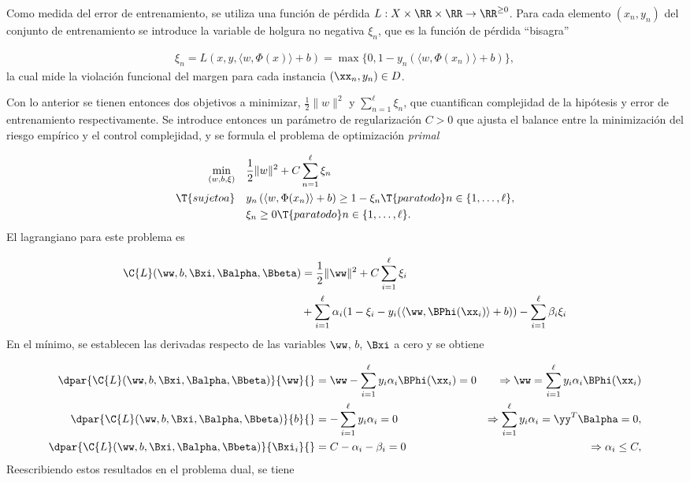 Como medida del error de entrenamiento, se utiliza una función de
pérdida $L:X\times\RR\times\RR\rightarrow\RR^{\geq0}$.  Para cada
elemento $(x_n,y_n)$ del conjunto de entrenamiento se introduce la
variable de holgura no negativa $\xi_n$, que es la función de pérdida
``bisagra''

\begin{align}
\xi_n = 
  L(x,y,\langle{}w,\Phi(x)\rangle+b) =
  \max\{0,1-y_n(\langle{}w,\Phi(x_n)\rangle+b)\},
\end{align}
la cual mide la violación funcional del margen para cada instancia
$(\xx_n,y_n)\in{}D$.

Con lo anterior se tienen entonces dos objetivos a minimizar,
$\frac{1}2{}\|w\|^2$ y $\sum_{n=1}^{\ell}\xi_n$, que cuantifican
complejidad de la hipótesis y error de entrenamiento respectivamente.
Se introduce entonces un parámetro de regularización $C>0$ que
ajusta el balance entre la minimización del riesgo empírico y
el control complejidad, y se formula el problema
de optimización \emph{primal}

\begin{align}
\label{svm-primal-blando}
  \begin{split}
    \min_{(w,b,\xi)} \quad & \frac{1}{2}\|w\|^2+C\sum_{n=1}^{\ell}\xi_n\\
    \T{sujeto a} \quad &
    y_n\left(\langle{}w,\Phi(x_n)\rangle+b\right) \geq 1-\xi_n \T{ para todo }
    n\in\{1,\ldots,\ell\}, \\
    & \xi_n \geq 0 \T{ para todo } n\in\{1,\ldots,\ell\}.
  \end{split}
\end{align}
El lagrangiano para este problema es

\begin{align}
  \begin{split}    
  \C{L}(\ww,b,\Bxi,\Balpha,\Bbeta) &= \frac{1}{2} \|\ww\|^2 + C \sum_{i=1}^{\ell} \xi_i \\
  &+ \sum_{i=1}^{\ell} \alpha_i (1-\xi_i-y_i(\langle\ww,\BPhi(\xx_i)\rangle+b)) - \sum_{i=1}^{\ell} \beta_i\xi_i
  \end{split}
\end{align}
En el mínimo, se establecen las derivadas respecto de las variables
$\ww$, $b$, $\Bxi$ a cero y se obtiene

\begin{align}
  \dpar{ \C{L}(\ww,b,\Bxi,\Balpha,\Bbeta)}{\ww}{}
    &=\ww-\sum_{i=1}^\ell y_i\alpha_i\BPhi(\xx_i) = 0
    &\Rightarrow \ww = \sum_{i=1}^\ell y_i\alpha_i\BPhi(\xx_i)
  \\
  \dpar{ \C{L}(\ww,b,\Bxi,\Balpha,\Bbeta)}{b}{}
    &=-\sum_{i=1}^\ell y_i\alpha_i = 0
    &\Rightarrow \sum_{i=1}^\ell y_i\alpha_i = \yy^T\Balpha = 0,\\  
  \dpar{ \C{L}(\ww,b,\Bxi,\Balpha,\Bbeta)}{\Bxi_i}{}
    &=C-\alpha_i-\beta_i = 0
    &\Rightarrow \alpha_i \leq C,
\end{align}
Reescribiendo estos resultados en el problema dual, se tiene


